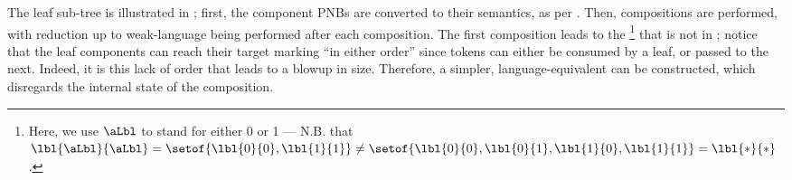 \begin{figure}[ht]
    \centering
\caption{}
\label{fig:distree33}
\end{figure}

The leaf sub-tree is illustrated in ; first, the
component PNBs are converted to their \TNFA{} semantics, as per
. Then, \TNFA{} compositions are performed, with
reduction up to weak-language being performed after each composition. The first
composition leads to the \TNFA{}\footnote{Here, we use $\aLbl$ to stand for
either 0 or 1 --- N.B. that $\lbl{\aLbl}{\aLbl} = \setof{\lbl{0}{0},
\lbl{1}{1}} \neq \setof{\lbl{0}{0}, \lbl{0}{1}, \lbl{1}{0}, \lbl{1}{1}} =
\lbl{*}{*}$.} that is not in ; notice
that the leaf components can reach their target marking ``in either order''
since tokens can either be consumed by a leaf, or passed to the next. Indeed,
it is this lack of order that leads to a blowup in \TNFA{} size. Therefore, a
simpler, language-equivalent \TNFA{} can be constructed, which disregards the
internal state of the composition.

